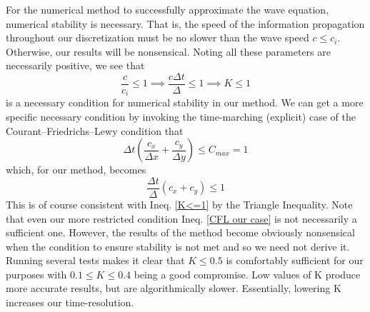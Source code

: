 \documentclass{article}
\begin{document}
For the numerical method to successfully approximate the wave equation, numerical stability is necessary. That is, the speed of the information propagation throughout our discretization must be no slower than the wave speed $c\leq c_i$. Otherwise, our results will be nonsensical. Noting all these parameters are necessarily positive, we see that
\begin{equation} \label{K<=1}
\frac{c}{c_i}\leq 1 \implies \frac{c\Delta t}{\Delta}\leq 1 \implies K\leq 1
\end{equation}
is a necessary condition for numerical stability in our method. We can get a more specific necessary condition by invoking the time-marching (explicit) case of the Courant--Friedrichs--Lewy condition that
\begin{equation}
\Delta t\left(\frac{c_x}{\Delta x}+\frac{c_y}{\Delta y}\right)\leq C_{max}=1
\end{equation}
which, for our method, becomes
\begin{equation} \label{CFL our case}
\frac{\Delta t}{\Delta}(c_x+c_y)\leq 1
\end{equation}
This is of course consistent with Ineq. \ref{K<=1} by the Triangle Inequality. Note that even our more restricted condition Ineq. \ref{CFL our case} is not necessarily a sufficient one. However, the results of the method become obviously nonsensical when the condition to ensure stability is not met and so we need not derive it. Running several tests makes it clear that $K\leq 0.5$ is comfortably sufficient for our purposes with $0.1\leq K\leq 0.4$ being a good compromise. Low values of K produce more accurate results, but are algorithmically slower. Essentially, lowering K increases our time-resolution.
\end{document}
